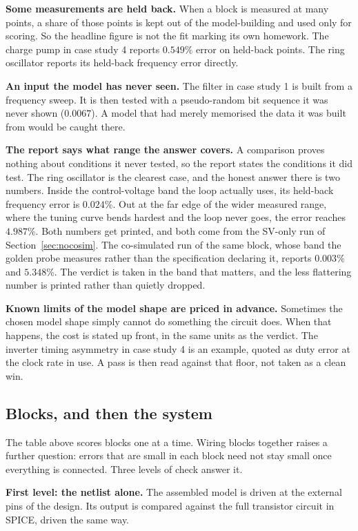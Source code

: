 \documentclass[11pt,a4paper]{article}
\begin{document}
\textbf{Some measurements are held back.} When a block is measured at
many points, a share of those points is kept out of the model-building
and used only for scoring. So the headline figure is not the fit
marking its own homework. The charge pump in case study 4 reports
$0.549\%$ error on held-back points. The ring oscillator reports its
held-back frequency error directly.

\textbf{An input the model has never seen.} The filter in case study 1
is built from a frequency sweep. It is then tested with a
pseudo-random bit sequence it was never shown ($0.0067$). A model that
had merely memorised the data it was built from would be caught
there.

\textbf{The report says what range the answer covers.} A comparison
proves nothing about conditions it never tested, so the report states
the conditions it did test. The ring oscillator is the clearest case,
and the honest answer there is two numbers. Inside the
control-voltage band the loop actually uses, its held-back frequency
error is $0.024\%$. Out at the far edge of the wider measured range,
where the tuning curve bends hardest and the loop never goes, the
error reaches $4.987\%$. Both numbers get printed, and both come from
the SV-only run of Section~\ref{sec:nocosim}. The co-simulated run of
the same block, whose band the golden probe measures rather than the
specification declaring it, reports $0.003\%$ and $5.348\%$. The
verdict is taken in the band that matters, and the less flattering
number is printed rather than quietly dropped.

\textbf{Known limits of the model shape are priced in advance.}
Sometimes the chosen model shape simply cannot do something the
circuit does. When that happens, the cost is stated up front, in the
same units as the verdict. The inverter timing asymmetry in case study
4 is an example, quoted as duty error at the clock rate in use. A pass
is then read against that floor, not taken as a clean win.

\subsection{Blocks, and then the system}

The table above scores blocks one at a time. Wiring blocks together
raises a further question: errors that are small in each block need
not stay small once everything is connected. Three levels of check
answer it.

\textbf{First level: the netlist alone.} The assembled model is driven
at the external pins of the design. Its output is compared against the
full transistor circuit in SPICE, driven the same way.
\end{document}
